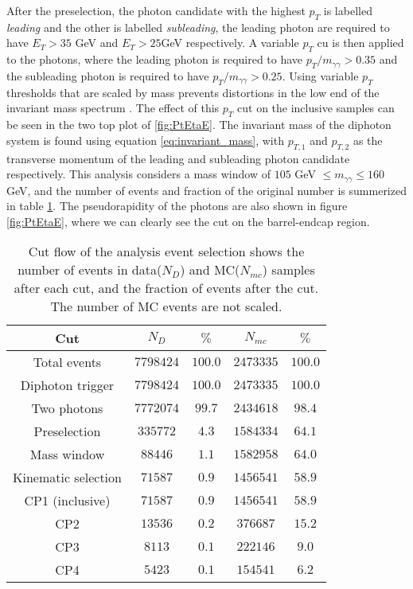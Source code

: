 \documentclass[10pt, aps, twocolumn, a4paper, nofootinbib]{revtex4}
\begin{document}
After the preselection, the photon candidate with the highest $p_T$ is labelled \textit{leading} and the other is labelled \textit{subleading}, the leading photon are required to have $E_T> 35$ GeV and $E_T > 25$GeV respectively. A variable $p_T$ cu is then applied to the photons, where the leading photon is required to have $p_T/m_{\gamma\gamma} > 0.35$ and the subleading photon is required to have $p_T/m_{\gamma\gamma} > 0.25$. Using variable $p_T$ thresholds that are scaled by mass prevents distortions in the low end of the invariant mass spectrum \citep{CMS_Hyy2018}. The effect of this $p_T$ cut on the inclusive samples can be seen in the two top plot of \ref{fig:PtEtaE}. The invariant mass of the diphoton system is found using equation \ref{eq:invariant_mass}, with $p_{T,1}$ and $p_{T,2}$ as the transverse momentum of the leading and subleading photon candidate respectively. This analysis considers a mass window of $105$ GeV $\leq m_{\gamma\gamma} \leq 160$ GeV, and the number of events and fraction of the original number is summerized in table \ref{tab:cutflow}. The pseudorapidity of the photons are also shown in figure \ref{fig:PtEtaE}, where we can clearly see the cut on the barrel-endcap region.\\

\begin{table}
\centering
\caption{Cut flow of the analysis event selection shows the number of events in data($N_D$) and MC($N_{mc}$) samples after each cut, and the fraction of events after the cut. The number of MC events are not scaled. \label{tab:cutflow}}
\setlength{\tabcolsep}{4pt} 
\begin{tabular}{ c | c  c | c  c }
\hline
Cut & $N_D $ & $\%$ & $N_{mc}$ & $\%$ \\ 
\hline
Total events & $7798424$ & $100.0$ & $2473335$ & $100.0$ \\
Diphoton trigger & $7798424$ & $100.0$ & $2473335$ & $100.0$ \\
Two photons & $7772074$ & $99.7$ & $2434618$ & $98.4$ \\
Preselection & $335772$ & $4.3$ & $1584334$ & $64.1$ \\
Mass window & $88446$ & $1.1$ & $1582958$ & $64.0$\\
Kinematic selection & $71587$ & $0.9$ & $1456541$ & $58.9$ \\
\hline
CP1 (inclusive) & $71587$ & $0.9$ & $1456541$ & $58.9$ \\
CP2 & $13536$ & $0.2$ & $376687$ & $15.2$ \\
CP3 & $8113$ & $0.1$ & $222146$ & $9.0$ \\
CP4 & $5423$ & $0.1$ & $154541$ & $6.2$ \\
\hline
\end{tabular}
\end{table}
\end{document}
